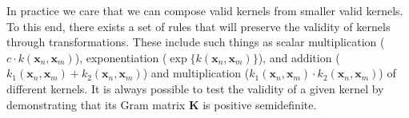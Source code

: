 
In practice we care that we can compose valid kernels from smaller valid kernels. To this end, there exists a set of rules that will preserve the validity of kernels through transformations. These include such things as scalar multiplication \big($c \cdot k(\textbf{x}_{n}, \textbf{x}_{m})$\big), exponentiation \big($\exp{\{k(\textbf{x}_{n}, \textbf{x}_{m})\}}$\big), and addition \big($k_{1}(\textbf{x}_{n}, \textbf{x}_{m}) + k_{2}(\textbf{x}_{n}, \textbf{x}_{m})$\big) and multiplication \big($k_{1}(\textbf{x}_{n}, \textbf{x}_{m}) \cdot k_{2}(\textbf{x}_{n}, \textbf{x}_{m})$\big) of different kernels. It is always possible to test the validity of a given kernel by demonstrating that its Gram matrix $\textbf{K}$ is positive semidefinite.

